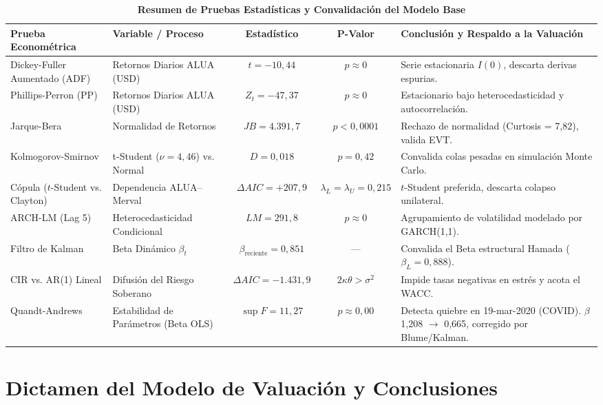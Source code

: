 \documentclass[11pt,a4paper]{article}
\begin{document}
\begin{table}[H]
\centering
\caption{\textbf{Resumen de Pruebas Estadísticas y Convalidación del Modelo Base}}
\scriptsize
\begin{tabularx}{\textwidth}{>{\raggedright\arraybackslash}p{3.2cm}>{\raggedright\arraybackslash}p{2.8cm}cc>{\raggedright\arraybackslash}X}
\toprule
\textbf{Prueba Econométrica} & \textbf{Variable / Proceso} & \textbf{Estadístico} & \textbf{P-Valor} & \textbf{Conclusión y Respaldo a la Valuación} \\
\midrule
Dickey-Fuller Aumentado (ADF) & Retornos Diarios ALUA (USD) & $t = -10,44$ & $p \approx 0$ & Serie estacionaria $I(0)$, descarta derivas espurias. \\
Phillips-Perron (PP) & Retornos Diarios ALUA (USD) & $Z_t = -47,37$ & $p \approx 0$ & Estacionario bajo heterocedasticidad y autocorrelación. \\
Jarque-Bera & Normalidad de Retornos & $JB = 4.391,7$ & $p < 0,0001$ & Rechazo de normalidad (Curtosis = 7,82), valida EVT. \\
Kolmogorov-Smirnov & t-Student ($\nu=4,46$) vs. Normal & $D = 0,018$ & $p = 0,42$ & Convalida colas pesadas en simulación Monte Carlo. \\
Cópula ($t$-Student vs. Clayton) & Dependencia ALUA--Merval & $\Delta AIC = +207,9$ & $\lambda_L=\lambda_U=0,215$ & $t$-Student preferida, descarta colapso unilateral. \\
ARCH-LM (Lag 5) & Heterocedasticidad Condicional & $LM = 291,8$ & $p \approx 0$ & Agrupamiento de volatilidad modelado por GARCH(1,1). \\
Filtro de Kalman & Beta Dinámico $\beta_t$ & $\beta_{\text{reciente}} = 0,851$ & --- & Convalida el Beta estructural Hamada ($\beta_L = 0,888$). \\
CIR vs. AR(1) Lineal & Difusión del Riesgo Soberano & $\Delta AIC = -1.431,9$ & $2\kappa\theta > \sigma^2$ & Impide tasas negativas en estrés y acota el WACC. \\
Quandt-Andrews & Estabilidad de Parámetros (Beta OLS) & $\sup F = 11,27$ & $p \approx 0,00$ & Detecta quiebre en 19-mar-2020 (COVID). $\beta$ 1,208 $\to$ 0,665, corregido por Blume/Kalman. \\
\bottomrule
\end{tabularx}
\end{table}

\section{Dictamen del Modelo de Valuación y Conclusiones}
\end{document}
